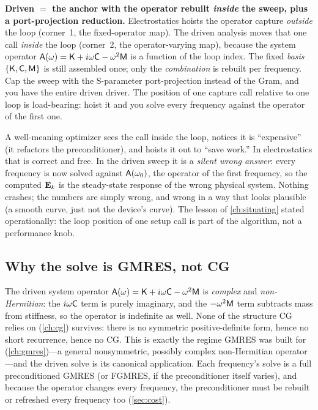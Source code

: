 \begin{keyidea}
\textbf{Driven $=$ the anchor with the operator rebuilt \emph{inside} the sweep,
plus a port-projection reduction.} Electrostatics hoists the operator capture
\emph{outside} the loop (corner~1, the fixed-operator map). The driven analysis
moves that one call \emph{inside} the loop (corner~2, the operator-varying map),
because the system operator $\mathsf{A}(\omega) = \mathsf{K} + i\omega\mathsf{C} - \omega^2\mathsf{M}$
is a function of the loop index. The fixed \emph{basis} $\{\mathsf{K},\mathsf{C},\mathsf{M}\}$ is
still assembled once; only the \emph{combination} is rebuilt per frequency. Cap
the sweep with the S-parameter port-projection instead of the Gram, and you have
the entire driven driver. The position of one capture call relative to one loop is
load-bearing: hoist it and you solve every frequency against the operator of the
first one.
\end{keyidea}

\begin{pitfall}
A well-meaning optimizer sees the  call inside the loop, notices
it is ``expensive'' (it refactors the preconditioner), and hoists it out to ``save
work.'' In electrostatics that is correct and free. In the driven sweep it is a
\emph{silent wrong answer}: every frequency is now solved against
$\mathsf{A}(\omega_0)$, the operator of the first frequency, so the computed
$\mathbf{E}_k$ is the steady-state response of the wrong physical system. Nothing crashes;
the numbers are simply wrong, and wrong in a way that looks plausible (a smooth
curve, just not the device's curve). The lesson of \cref{ch:situating} stated
operationally: the loop position of one setup call is part of the algorithm, not a
performance knob.
\end{pitfall}

\subsection{Why the solve is GMRES, not CG}

The driven system operator $\mathsf{A}(\omega) = \mathsf{K} + i\omega\mathsf{C} - \omega^2\mathsf{M}$ is
\emph{complex} and \emph{non-Hermitian}: the $i\omega\mathsf{C}$ term is purely
imaginary, and the $-\omega^2\mathsf{M}$ term subtracts mass from stiffness, so the
operator is indefinite as well. None of the structure CG relies on (\cref{ch:cg})
survives: there is no symmetric positive-definite form, hence no short
recurrence, hence no CG. This is exactly the regime GMRES was built for
(\cref{ch:gmres})---a general nonsymmetric, possibly complex non-Hermitian
operator---and the driven solve is its canonical application. Each frequency's
solve is a full preconditioned GMRES (or FGMRES, if the preconditioner itself
varies), and because the operator changes every frequency, the preconditioner must
be rebuilt or refreshed every frequency too (\cref{sec:cost}).


